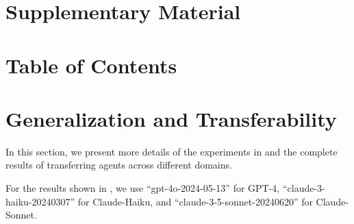 


\section*{\LARGE Supplementary Material}

\vspace*{20pt}
\section*{Table of Contents}
\vspace*{-5pt}
\startcontents[sections]

\clearpage

\section{Generalization and Transferability}
\label{append_section:transfer}



In this section, we present more details of the experiments in  and the complete results of transferring agents across different domains.

For the results shown in , we use ``gpt-4o-2024-05-13'' for GPT-4, ``claude-3-haiku-20240307'' for Claude-Haiku, and ``claude-3-5-sonnet-20240620'' for Claude-Sonnet.


